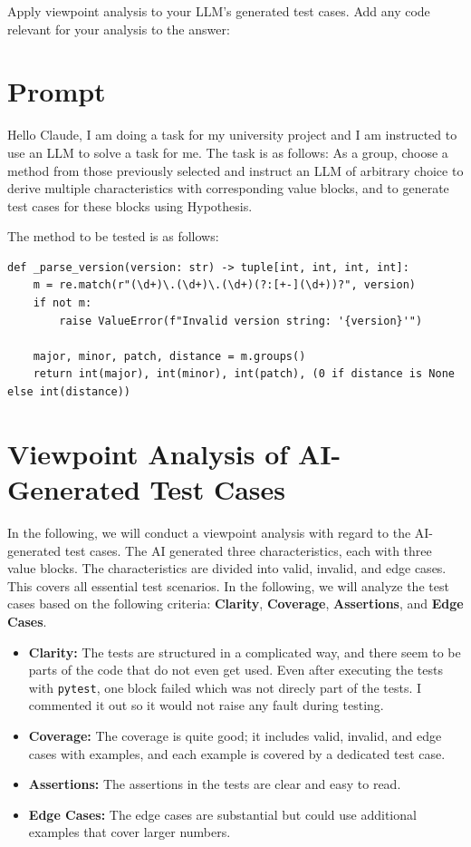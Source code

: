 \documentclass[a4paper]{scrreprt}
\begin{document}
\begin{aiTask}
  Apply viewpoint analysis to your LLM's generated test cases. Add any code relevant for your analysis to the answer:
  \begin{answer}
    
    \noindent 
    \section*{Prompt}
Hello Claude, I am doing a task for my university project and I am instructed to use an LLM to solve a task for me. The task is as follows:
As a group, choose a method from those previously selected and instruct an LLM of arbitrary choice to derive multiple characteristics with corresponding value blocks, and to generate test cases for these blocks using {Hypothesis}.


The method to be tested is as follows:

\begin{lstlisting}
def _parse_version(version: str) -> tuple[int, int, int, int]:
    m = re.match(r"(\d+)\.(\d+)\.(\d+)(?:[+-](\d+))?", version)
    if not m:
        raise ValueError(f"Invalid version string: '{version}'")

    major, minor, patch, distance = m.groups()
    return int(major), int(minor), int(patch), (0 if distance is None else int(distance))
\end{lstlisting}

\section*{Viewpoint Analysis of AI-Generated Test Cases}

In the following, we will conduct a viewpoint analysis with regard to the AI-generated test cases. The AI generated three characteristics, each with three value blocks. The characteristics are divided into valid, invalid, and edge cases. This covers all essential test scenarios. In the following, we will analyze the test cases based on the following criteria: \textbf{Clarity}, \textbf{Coverage}, \textbf{Assertions}, and \textbf{Edge Cases}.

\begin{itemize}
  \item \textbf{Clarity:} The tests are structured in a complicated way, and there seem to be parts of the code that do not even get used. Even after executing the tests with \texttt{pytest}, one block failed which was not direcly part of the tests. I commented it out so it would not raise any fault during testing.
  \item \textbf{Coverage:} The coverage is quite good; it includes valid, invalid, and edge cases with examples, and each example is covered by a dedicated test case.
  \item \textbf{Assertions:} The assertions in the tests are clear and easy to read.
  \item \textbf{Edge Cases:} The edge cases are substantial but could use additional examples that cover larger numbers.
\end{itemize}


\end{answer}
\end{aiTask}
\end{document}
